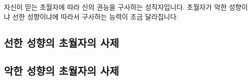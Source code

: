 \documentclass{report}
\begin{document}
	
	자신이 믿는 초월자에 따라 신의 권능을 구사하는 성직자입니다. 초월자가 악한 성향이냐 선한 성향이냐에 따라서 구사하는 능력이 조금 달라집니다.
	
	\subsection{선한 성향의 초월자의 사제}
		
		
	\subsection{악한 성향의 초월자의 사제}
		
\end{document}
